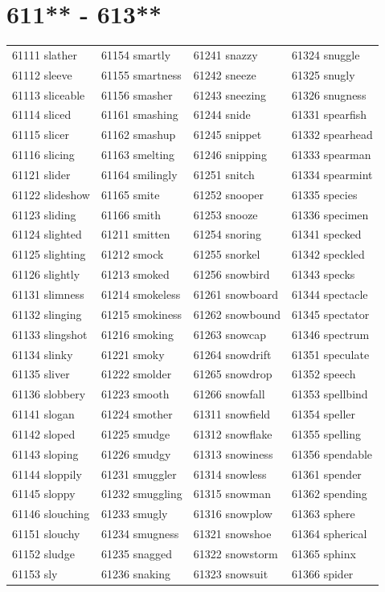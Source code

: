 \documentclass[10pt, oneside]{book}
\begin{document}
\begin{table}
	\centering
	\section*{611** - 613**}
	\begin{tabular}{l l l l}
61111 slather &61154 smartly &61241 snazzy &61324 snuggle\\
61112 sleeve &61155 smartness &61242 sneeze &61325 snugly\\
61113 sliceable &61156 smasher &61243 sneezing &61326 snugness\\
61114 sliced &61161 smashing &61244 snide &61331 spearfish\\
61115 slicer &61162 smashup &61245 snippet &61332 spearhead\\
61116 slicing &61163 smelting &61246 snipping &61333 spearman\\
61121 slider &61164 smilingly &61251 snitch &61334 spearmint\\
61122 slideshow &61165 smite &61252 snooper &61335 species\\
61123 sliding &61166 smith &61253 snooze &61336 specimen\\
61124 slighted &61211 smitten &61254 snoring &61341 specked\\
61125 slighting &61212 smock &61255 snorkel &61342 speckled\\
61126 slightly &61213 smoked &61256 snowbird &61343 specks\\
61131 slimness &61214 smokeless &61261 snowboard &61344 spectacle\\
61132 slinging &61215 smokiness &61262 snowbound &61345 spectator\\
61133 slingshot &61216 smoking &61263 snowcap &61346 spectrum\\
61134 slinky &61221 smoky &61264 snowdrift &61351 speculate\\
61135 sliver &61222 smolder &61265 snowdrop &61352 speech\\
61136 slobbery &61223 smooth &61266 snowfall &61353 spellbind\\
61141 slogan &61224 smother &61311 snowfield &61354 speller\\
61142 sloped &61225 smudge &61312 snowflake &61355 spelling\\
61143 sloping &61226 smudgy &61313 snowiness &61356 spendable\\
61144 sloppily &61231 smuggler &61314 snowless &61361 spender\\
61145 sloppy &61232 smuggling &61315 snowman &61362 spending\\
61146 slouching &61233 smugly &61316 snowplow &61363 sphere\\
61151 slouchy &61234 smugness &61321 snowshoe &61364 spherical\\
61152 sludge &61235 snagged &61322 snowstorm &61365 sphinx\\
61153 sly &61236 snaking &61323 snowsuit &61366 spider\\
	\end{tabular}
 \end{table}
\clearpage
\end{document}
